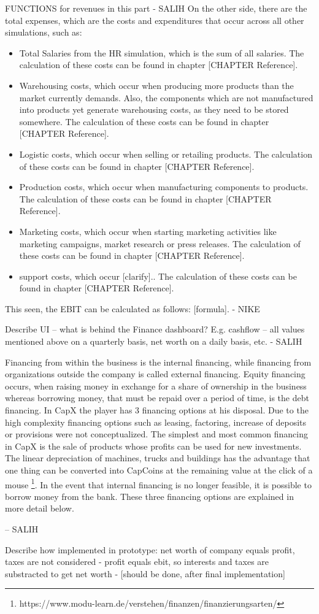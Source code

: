 FUNCTIONS for revenues in this part - SALIH
On the other side, there are the total expenses, which are the costs and expenditures that occur across all other simulations, such as:
\begin{itemize}
    \item Total Salaries from the HR simulation, which is the sum of all salaries. The calculation of these costs can be found in chapter [CHAPTER Reference].
    \item Warehousing costs, which occur when producing more products than the market currently demands. Also, the components which are not manufactured into products yet generate warehousing costs, as they need to be stored somewhere. The calculation of these costs can be found in chapter [CHAPTER Reference]. 
    \item Logistic costs, which occur when selling or retailing products. The calculation of these costs can be found in chapter [CHAPTER Reference].
    \item Production costs, which occur when manufacturing components to products. The calculation of these costs can be found in chapter [CHAPTER Reference].
    \item Marketing costs, which occur when starting marketing activities like marketing campaigns, market research or press releases. The calculation of these costs can be found in chapter [CHAPTER Reference].
    \item support costs, which occur [clarify].. The calculation of these costs can be found in chapter [CHAPTER Reference].
\end{itemize}

This seen, the EBIT can be calculated as follows: [formula]. - NIKE

Describe UI – what is behind the Finance dashboard? E.g. cashflow – all values mentioned above on a quarterly basis, net worth on a daily basis, etc. - SALIH

Financing from within the business is the internal financing, while financing from organizations outside the company is called external financing. Equity financing occurs, when raising money in exchange for a share of ownership in the business whereas borrowing money, that must be repaid over a period of time, is the debt financing. 
In CapX the player has 3 financing options at his disposal. Due to the high complexity financing options such as leasing, factoring, increase of deposits or provisions were not conceptualized. 
The simplest and most common financing in CapX is the sale of products whose profits can be used for new investments. The linear depreciation of machines, trucks and buildings has the advantage that one thing can be converted into CapCoins at the remaining value at the click of a mouse \footnote{https://www.modu-learn.de/verstehen/finanzen/finanzierungsarten/}.
In the event that internal financing is no longer feasible, it is possible to borrow money from the bank. These three financing options are explained in more detail below.

– SALIH

Describe how implemented in prototype: net worth of company equals profit, taxes are not considered - profit equals ebit, so interests and taxes are substracted to get net worth - [should be done, after final implementation]